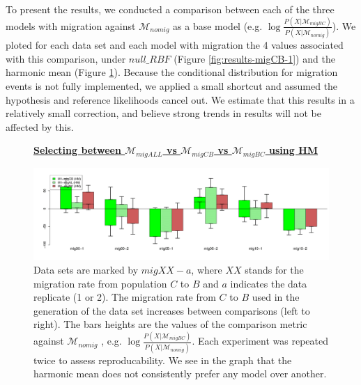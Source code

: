 \documentclass[11pt]{article}
\newcommand{\M}{\mathcal{M}}
\newcommand{\1}{\mathbbm{1}}
\newcommand{\figuretitle}[1]{
	\centering
	\underline{\textbf{#1}}
	\par
	\medskip
}
\begin{document}
To present the results, we conducted a comparison between each of the three models with migration against $\M_{nomig}$ as a base model (e.g. $\log{ \frac{P(X|\M_{migBC})}{P(X|\M_{nomig})}}$). 
%
We ploted for each data set and each model with migration the 4 values associated with this comparison, under $null\_RBF$ (Figure \ref{fig:results-migCB-1}) and the harmonic mean (Figure \ref{fig:results-migCB-2}). 
%
Because the conditional distribution for migration events is not fully implemented, we applied a small shortcut and assumed the hypothesis and reference likelihoods cancel out. We estimate that this results in a relatively small correction, and believe strong trends in results will not be affected by this.



\begin{figure}[H]

\figuretitle{Selecting between $\M_{migALL}$ vs $\M_{migCB}$ vs $\M_{migBC}$ using HM}

\includegraphics[width=1.0\textwidth]{results/results-migCB-select-2}
\captionsetup{width=1.0\textwidth}
\caption{
Data sets are marked by $migXX-a$, where $XX$ stands for the migration rate from population $C$ to $B$ and $a$ indicates the data replicate (1 or 2).
%
The migration rate from $C$ to $B$ used in the generation of the data set increases between comparisons (left to right).
%
The bars heights are the values of the comparison metric against $\M_{nomig}$ , e.g. $\log{ \frac{P(X|\M_{migBC})}{P(X|\M_{nomig})}}$.
%
Each experiment was repeated twice to assess reproducability.
%
We see in the graph that the harmonic mean does not consistently prefer any model over another.
}
\label{fig:results-migCB-2}
\end{figure}
\end{document}
